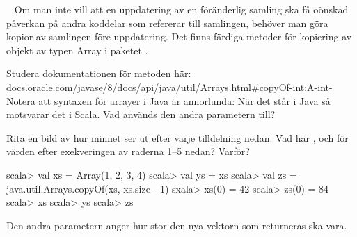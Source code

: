 
\QUESTBEGIN

\Task  \what~  Om man inte vill att en uppdatering av en föränderlig samling ska få oönskad påverkan på andra koddelar som refererar till samlingen, behöver man göra kopior av samlingen före uppdatering. Det finns färdiga metoder för kopiering av objekt av typen Array i paketet .

\Subtask\Pen Studera dokumentationen för metoden  här:\\ \href{https://docs.oracle.com/javase/8/docs/api/java/util/Arrays.html\#copyOf-int:A-int-}{docs.oracle.com/javase/8/docs/api/java/util/Arrays.html\#copyOf-int:A-int-} \\
Notera att syntaxen för arrayer i Java är annorlunda: När det står  i Java så motsvarar det  i Scala. Vad används den andra parametern till?

\Subtask\Pen Rita en bild av hur minnet ser ut efter varje tilldelning nedan. Vad har ,  och  för värden efter exekveringen av raderna 1--5 nedan? Varför?
\begin{REPL}
scala> val xs = Array(1, 2, 3, 4)
scala> val ys = xs
scala> val zs = java.util.Arrays.copyOf(xs, xs.size - 1)
sxala> xs(0) = 42
scala> zs(0) = 84
scala> xs
scala> ys
scala> zs
\end{REPL}

\SOLUTION


\TaskSolved \what


\SubtaskSolved  Den andra parametern anger hur stor den nya vektorn som returneras ska vara.

